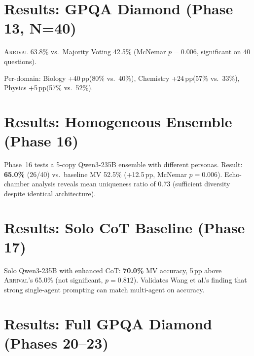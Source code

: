 \documentclass[11pt,a4paper]{article}
\newcommand{\arrival}{\textsc{Arrival}\xspace}
\newcommand{\pp}{\,pp\xspace}
\begin{document}
\section{Results: GPQA Diamond (Phase 13, N=40)}\label{sec:gpqa40}

\begin{resultbox}
\arrival 63.8\% vs.\ Majority Voting 42.5\%
(McNemar $p = 0.006$, significant on 40 questions).
\end{resultbox}

Per-domain: Biology +40\pp (80\% vs.\ 40\%), Chemistry +24\pp (57\%
vs.\ 33\%), Physics +5\pp (57\% vs.\ 52\%).

\section{Results: Homogeneous Ensemble (Phase 16)}

Phase~16 tests a 5-copy Qwen3-235B ensemble with different personas.
Result: \textbf{65.0\%} (26/40) vs.\ baseline MV 52.5\% (+12.5\pp,
McNemar $p=0.006$).  Echo-chamber analysis reveals mean uniqueness
ratio of 0.73 (sufficient diversity despite identical architecture).

\section{Results: Solo CoT Baseline (Phase 17)}

Solo Qwen3-235B with enhanced CoT: \textbf{70.0\%} MV accuracy,
5\pp above \arrival's 65.0\% (not significant, $p=0.812$).  Validates
Wang et al.'s finding that strong single-agent prompting can match
multi-agent on accuracy.

\section{Results: Full GPQA Diamond (Phases 20--23)}\label{sec:gpqa198}
\end{document}
